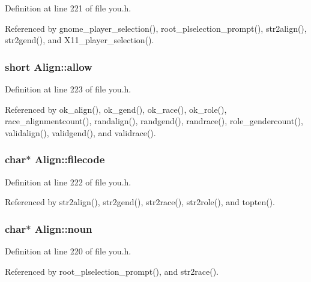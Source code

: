 Definition at line 221 of file you.\+h.



Referenced by gnome\+\_\+player\+\_\+selection(), root\+\_\+plselection\+\_\+prompt(), str2align(), str2gend(), and X11\+\_\+player\+\_\+selection().

\hypertarget{structAlign_a3c94cc9ef4661f20258e562e860d66e9}{
\subsubsection[{allow}]{\setlength{\rightskip}{0pt plus 5cm}short Align\+::allow}}\label{structAlign_a3c94cc9ef4661f20258e562e860d66e9}


Definition at line 223 of file you.\+h.



Referenced by ok\+\_\+align(), ok\+\_\+gend(), ok\+\_\+race(), ok\+\_\+role(), race\+\_\+alignmentcount(), randalign(), randgend(), randrace(), role\+\_\+gendercount(), validalign(), validgend(), and validrace().

\hypertarget{structAlign_aea4daca6016229d80d97c0e8fe349cd7}{
\subsubsection[{filecode}]{ char$\ast$ Align\+::filecode}}\label{structAlign_aea4daca6016229d80d97c0e8fe349cd7}


Definition at line 222 of file you.\+h.



Referenced by str2align(), str2gend(), str2race(), str2role(), and topten().

\hypertarget{structAlign_a94d7781f2c6519d3a4f61e739ce8bedc}{
\subsubsection[{noun}]{ char$\ast$ Align\+::noun}}\label{structAlign_a94d7781f2c6519d3a4f61e739ce8bedc}


Definition at line 220 of file you.\+h.



Referenced by root\+\_\+plselection\+\_\+prompt(), and str2race().

